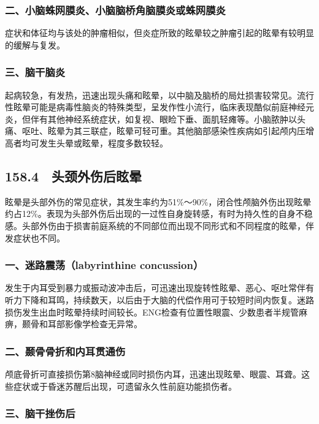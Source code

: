\subsubsection{二、小脑蛛网膜炎、小脑脑桥角脑膜炎或蛛网膜炎}

症状和体征均与该处的肿瘤相似，但炎症所致的眩晕较之肿瘤引起的眩晕有较明显的缓解与复发。

\subsubsection{三、脑干脑炎}

起病较急，有发热，迅速出现头痛和眩晕，以中脑及脑桥的局灶损害较常见。流行性眩晕可能是病毒性脑炎的特殊类型，呈发作性小流行，临床表现酷似前庭神经元炎，但伴有其他神经系统症状，如复视、眼睑下垂、面肌轻瘫等。小脑脓肿以头痛、呕吐、眩晕为其三联症，眩晕可轻可重。其他脑部感染性疾病如引起颅内压增高者均可发生头晕或眩晕，程度多数较轻。

\subsection{158.4　头颈外伤后眩晕}

眩晕是头部外伤的常见症状，其发生率约为51\%～90\%，闭合性颅脑外伤出现眩晕约占12\%。表现为头部外伤后出现的一过性自身旋转感，有时为持久性的自身不稳感。头部外伤由于损害前庭系统的不同部位而出现不同形式和不同程度的眩晕，伴发症状也不同。

\subsubsection{一、迷路震荡（labyrinthine concussion）}

发生于内耳受到暴力或振动波冲击后，可迅速出现旋转性眩晕、恶心、呕吐常伴有听力下降和耳鸣，持续数天，以后由于大脑的代偿作用可于较短时间内恢复。迷路损伤发生出血时眩晕持续时间较长。ENG检查有位置性眼震、少数患者半规管麻痹，颞骨和耳部影像学检查无异常。

\subsubsection{二、颞骨骨折和内耳贯通伤}

颅底骨折可直接损伤第8脑神经或同时损伤内耳，迅速出现眩晕、眼震、耳聋。这些症状或于昏迷苏醒后出现，可遗留永久性前庭功能损伤者。

\subsubsection{三、脑干挫伤后}

